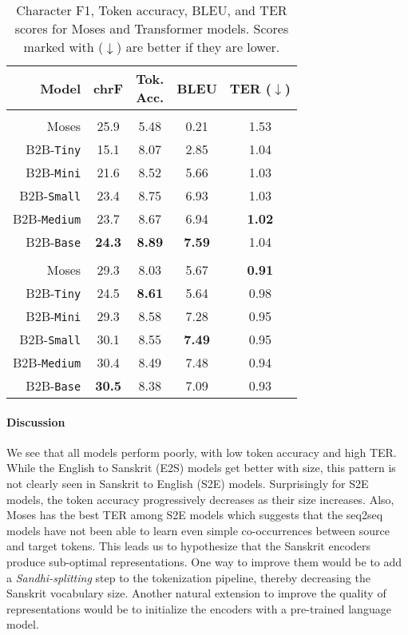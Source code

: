 \documentclass[11pt,a4paper]{article}
\begin{document}
\begin{table}
    \centering
    \small
    \begin{tabular}{r|cccc}
        \toprule
        Model & chrF & \thead{Tok. \\Acc.} & BLEU & \thead{TER\\($\downarrow$)} \\
        \midrule
        \rowcolor{Gray}\multicolumn{5}{c}{English to Sanskrit} \\
        Moses            & 25.9 & 5.48 & 0.21 & 1.53 \\ 
        B2B-{\tt Tiny}   & 15.1 & 8.07 & 2.85 & 1.04 \\
        B2B-{\tt Mini}   & 21.6 & 8.52 & 5.66 & 1.03 \\
        B2B-{\tt Small}  & 23.4 & 8.75 & 6.93 & 1.03  \\
        B2B-{\tt Medium} & 23.7 & 8.67 & 6.94 & \textbf{1.02} \\
        B2B-{\tt Base}   & \textbf{24.3} & \textbf{8.89} & \textbf{7.59} & 1.04 \\
        \rowcolor{Gray}\multicolumn{5}{c}{Sanskrit to English} \\
        Moses            & 29.3 & 8.03 & 5.67 & \textbf{0.91} \\ 
        B2B-{\tt Tiny}   & 24.5 & \textbf{8.61} & 5.64 & 0.98 \\
        B2B-{\tt Mini}   & 29.3 & 8.58 & 7.28 & 0.95 \\
        B2B-{\tt Small}  & 30.1 & 8.55 & \textbf{7.49} & 0.95 \\
        B2B-{\tt Medium} & 30.4 & 8.49 & 7.48 & 0.94 \\
        B2B-{\tt Base}   & \textbf{30.5} & 8.38 & 7.09 & 0.93 \\
        \bottomrule
    \end{tabular}
    \caption{Character F1, Token accuracy, BLEU, and TER scores for Moses and Transformer models. Scores marked with ($\downarrow$) are better if they are lower.}
    \label{tbl:results}
\end{table}

\paragraph{Discussion} We see that all models perform poorly, with low token accuracy and high TER. While the English to Sanskrit (E2S) models get better with size, this pattern is not clearly seen in Sanskrit to English (S2E) models. Surprisingly for S2E models, the token accuracy progressively decreases as their size increases. Also, Moses has the best TER among S2E models which suggests that the seq2seq models have not been able to learn even simple co-occurrences between source and target tokens. This leads us to hypothesize that the Sanskrit encoders produce sub-optimal representations. One way to improve them would be to add a {\it Sandhi-splitting} step to the tokenization pipeline, thereby decreasing the Sanskrit vocabulary size. Another natural extension to improve the quality of representations would be to initialize the encoders with a pre-trained language model.
\end{document}
